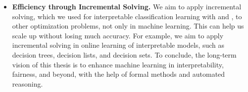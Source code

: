 \begin{itemize}
	\item \textbf{Efficiency through Incremental Solving.} We aim to apply incremental solving, which we used for interpretable classification learning with {\imli} and {\crr}, to other optimization problems, not only in machine learning. This can help us scale up without losing much accuracy. For example, we aim to apply incremental solving in online learning of interpretable models, such as decision trees, decision lists, and decision sets. To conclude, the long-term vision of this thesis is to enhance machine learning in interpretability, fairness, and beyond, with the help of formal methods and automated reasoning.
\end{itemize}

 

\begin{comment}
	\begin{itemize}
		\item Fairness repair
		\item Incremental solving
		\item Fairness and interpretability as a service to more complex models.
	\end{itemize}
\end{comment}
